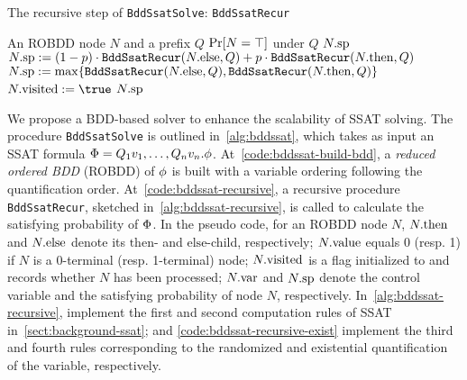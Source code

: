 \begin{algorithm}[t]
    \caption{The recursive step of \texttt{BddSsatSolve}: \texttt{BddSsatRecur}}
    \label{alg:bddssat-recursive}
    \begin{algorithmic}[1]
        \REQUIRE An ROBDD node $N$ and a prefix $Q$
        \ENSURE $\Pr[N=\top]$ under $Q$
        \label{code:bddssat-recursive-constant-start}
        \RETURN $N.\mathrm{sp}$\label{code:bddssat-recursive-constant-end}
        \ENDIF
        \STATE $N.\mathrm{sp}:=(1-p)\cdot\texttt{BddSsatRecur}(N.\mathrm{else},Q)+p\cdot\texttt{BddSsatRecur}(N.\mathrm{then},Q)$
        \label{code:bddssat-recursive-random}
        \ELSE
        \STATE $N.\mathrm{sp}:=\max\{\texttt{BddSsatRecur}(N.\mathrm{else},Q),\texttt{BddSsatRecur}(N.\mathrm{then},Q)\}$
        \label{code:bddssat-recursive-exist}
        \ENDIF
        \STATE $\nodevisit{N} := \true$
        \ENDIF
        \RETURN $N.\mathrm{sp}$
    \end{algorithmic}
\end{algorithm}

We propose a BDD-based solver to enhance the scalability of SSAT solving.
The procedure \texttt{BddSsatSolve} is outlined in~\cref{alg:bddssat},
which takes as input an SSAT formula $\Phi=Q_1 v_1,\ldots,Q_n v_n.\phi$.
At~\cref{code:bddssat-build-bdd},
a \textit{reduced ordered BDD} (ROBDD) of $\phi$ is built with a variable ordering following the quantification order.
At~\cref{code:bddssat-recursive},
a recursive procedure \texttt{BddSsatRecur},
sketched in~\cref{alg:bddssat-recursive},
is called to calculate the satisfying probability of $\Phi$.
In the pseudo code, for an ROBDD node $N$,
$N.\mathrm{then}$ and $N.\mathrm{else}$ denote its $\mathrm{then}$- and $\mathrm{else}$-child, respectively;
$N.\mathrm{value}$ equals 0 (resp. 1) if $N$ is a 0-terminal (resp. 1-terminal) node;
$N.\mathrm{visited}$ is a flag initialized to \false and records whether $N$ has been processed;
$N.\mathrm{var}$ and $N.\mathrm{sp}$ denote the control variable and the satisfying probability of node $N$, respectively.
In~\cref{alg:bddssat-recursive},
 implement the first and second computation rules of SSAT in~\cref{sect:background-ssat};
 and \cref{code:bddssat-recursive-exist} implement the third and fourth rules corresponding to the randomized and existential quantification of the variable, respectively.

